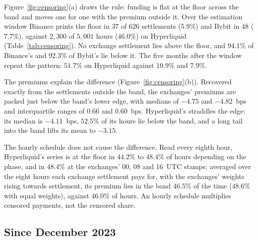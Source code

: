 \documentclass[10pt,a4paper]{article}
\begin{document}
\begin{table}[tbp]
  \centering
  \caption{Funding settlements exactly at the floor, by venue and window, BTC perpetuals, compared as decimals. \emph{Below}: settlements under the floor, the premium below the band. \emph{Median} and \emph{Quartiles}: the premium in bps, Hyperliquid's hourly average and the exchanges' recovered from their settlements; settlements at the floor rank between those below and above the band, so the quantiles are exact. The second row reads Hyperliquid's hourly series at the exchanges' 00, 08 and 16~UTC stamps.}
  \label{tab:censoring}
  \small
  \setlength{\tabcolsep}{4pt}
  
\end{table}

Figure~\ref{fig:censoring}(a) draws the rule: funding is flat at the floor across the band and moves one for one with the premium outside it. Over the estimation window Binance prints the floor in $37$ of $626$ settlements ($5.9\%$) and Bybit in $48$ ($7.7\%$), against $2{,}300$ of $5{,}001$ hours ($46.0\%$) on Hyperliquid (Table~\ref{tab:censoring}). No exchange settlement lies above the floor, and $94.1\%$ of Binance's and $92.3\%$ of Bybit's lie below it. The five months after the window repeat the pattern: $51.7\%$ on Hyperliquid against $10.9\%$ and $7.9\%$.

The premiums explain the difference (Figure~\ref{fig:censoring}(b)). Recovered exactly from the settlements outside the band, the exchanges' premiums are packed just below the band's lower edge, with medians of $-4.75$ and $-4.82$~bps and interquartile ranges of $0.66$ and $0.60$~bps. Hyperliquid's straddles the edge: its median is $-4.11$~bps, $52.5\%$ of its hours lie below the band, and a long tail into the band lifts its mean to $-3.15$.

The hourly schedule does not cause the difference. Read every eighth hour, Hyperliquid's series is at the floor in $44.2\%$ to $48.4\%$ of hours depending on the phase, and in $48.4\%$ at the exchanges' 00, 08 and 16~UTC stamps; averaged over the eight hours each exchange settlement pays for, with the exchanges' weights rising towards settlement, its premium lies in the band $46.5\%$ of the time ($48.6\%$ with equal weights), against $46.0\%$ of hours. An hourly schedule multiplies censored payments, not the censored share.

\subsection{Since December 2023}\label{ssec:history}
\end{document}
